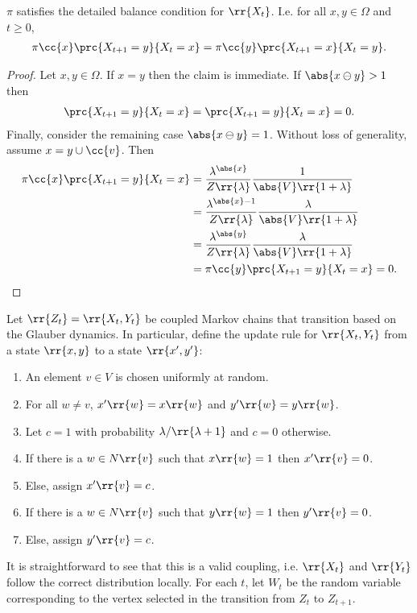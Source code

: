 \documentclass{article}
\begin{document}
\begin{claim*}[2]
  $\pi$ satisfies the detailed balance condition for $\rr{X_t}$.
  I.e. for all $x,y\in\Omega$ and $t\geq 0$,
  \begin{align*}
    \pi\cc{x}\prc{X_{t+1}=y}{X_t=x}=\pi\cc{y}\prc{X_{t+1}=x}{X_t=y}.
  \end{align*}
  \begin{proof}
    Let $x,y\in\Omega$. If $x=y$ then the claim is immediate. If $\abs{x\ominus y}>1$ then
    \begin{align*}
      \prc{X_{t+1}=y}{X_t=x}=\prc{X_{t+1}=y}{X_t=x}=0.
    \end{align*}
    Finally, consider the remaining case $\abs{x\ominus y}=1$. Without loss of generality, assume $x=y\cup\cc{v}$. Then
    \begin{align*}
      \pi\cc{x} \prc{X_{t+1}=y}{X_t=x}
      &={\frac{\lambda^{\abs{x}}}{Z\rr{\lambda}}}{\frac{1}{\abs{V}\rr{1+\lambda}}} \\
      &={\frac{\lambda^{\abs{x}-1}}{Z\rr{\lambda}}}{\frac{\lambda}{\abs{V}\rr{1+\lambda}}} \\
      &={\frac{\lambda^{\abs{y}}}{Z\rr{\lambda}}}{\frac{\lambda}{\abs{V}\rr{1+\lambda}}} \\
      &=\pi\cc{y}\prc{X_{t+1}=y}{X_t=x}=0.
    \end{align*}
  \end{proof}
\end{claim*}

Let $\rr{Z_t}=\rr{X_t,Y_t}$ be coupled Markov chains that transition
based on the Glauber dynamics. In particular, define the update rule for $\rr{X_t,Y_t}$
from a state $\rr{x,y}$ to a state $\rr{x',y'}$:
\begin{enumerate}
  \item An element $v\in V$ is chosen uniformly at random.
  \item For all $w\neq v$, $x'\rr{w}=x\rr{w}$ and $y'\rr{w}=y\rr{w}$.
  \item Let $c=1$ with probability $\lambda/\rr{\lambda+1}$ and $c=0$ otherwise.
  \item If there is a $w\in N\rr{v}$ such that $x\rr{w}=1$ then $x'\rr{v}=0$.
  \item Else, assign $x'\rr{v}=c$.
  \item If there is a $w\in N\rr{v}$ such that $y\rr{w}=1$ then $y'\rr{v}=0$.
  \item Else, assign $y'\rr{v}=c$.
\end{enumerate}
It is straightforward to see that this is a valid coupling, i.e. $\rr{X_t}$ and $\rr{Y_t}$
follow the correct distribution locally. For each $t$, let $W_t$ be the random variable
corresponding to the vertex selected in the transition from $Z_t$ to $Z_{t+1}$.
\end{document}
